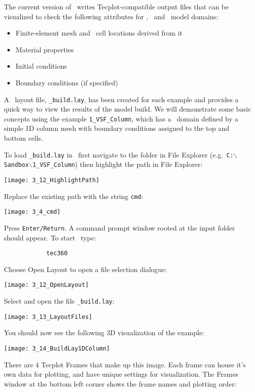 The current version of \mut\ writes Tecplot-compatible output files that can be visualized to check the following attributes for \gwf, \swf\ and \cln\ model domains:
\begin{itemize}
  \item Finite-element mesh and \mfus\ cell locations derived from it
  \item Material properties
  \item Initial conditions
  \item Boundary conditions (if specified)
\end{itemize}

A \tecplot\ layout file, \texttt{\_build.lay}, has been created for each example and  provides a quick way to view the results of the model build.
We will demonstrate some basic concepts using the example \texttt{1\_VSF\_Column}, which has a \gwf\ domain defined by a simple 1D column mesh with boundary conditions assigned to the  top and bottom cells.

To load \texttt{\_build.lay} in \tecplot\ first navigate to the folder in File Explorer (e.g.\ \texttt{C:$\backslash$Sandbox$\backslash$1\_VSF\_Column}) then highlight the path in File Explorer:

        \texttt{[image: 3\_12\_HighlightPath]}

Replace the existing path with the string {\tt cmd}:

        \texttt{[image: 3\_4\_cmd]}

Press {\tt Enter/Return}. A command prompt window rooted at the input folder should appear. To start \tecplot\, type:
        \begin{verbatim}
            tec360
        \end{verbatim}

Choose {\sf Open Layout} to open a file selection dialogue:

        \texttt{[image: 3\_12\_OpenLayout]}

Select and open the file \texttt{\_build.lay}:

        \texttt{[image: 3\_13\_LayoutFiles]}

You should now see the following 3D visualization of the example:

        \texttt{[image: 3\_14\_BuildLay1DColumn]}

There are 4 Tecplot {\sf Frames} that make up this image.  Each frame can house it's own data for plotting, and have unique settings for visualization.  The {\sf Frames} window at the bottom left corner shows the frame names and plotting order:

